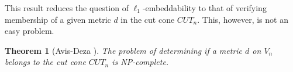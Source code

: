 \documentclass[12pt]{amsart}
\newtheorem{theorem}{Theorem}
\numberwithin{theorem}{section}
\theoremstyle{remark}
\begin{document}
This result reduces the question of $\ell_1$-embeddability to that of verifying membership of a given metric $d$ in the cut cone $CUT_n$. This, however, is not an easy problem.  
\begin{theorem} [Avis-Deza \cite{AvisDeza}] The problem of determining if a metric $d$ on $V_n$ belongs to the cut cone $CUT_n$ is NP-complete. 
\end{theorem}
%
%
\end{document}

